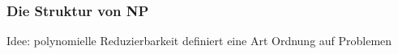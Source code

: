 \documentclass[aspectratio=1610,onlymath]{beamer}
\begin{document}
\begin{frame}[t]\frametitle{Die Struktur von NP}
Idee: polynomielle Reduzierbarkeit definiert eine Art Ordnung auf Problemen

\vspace{1cm}
\begin{center}
%
%
%

\end{center}
\end{frame}
\end{document}
